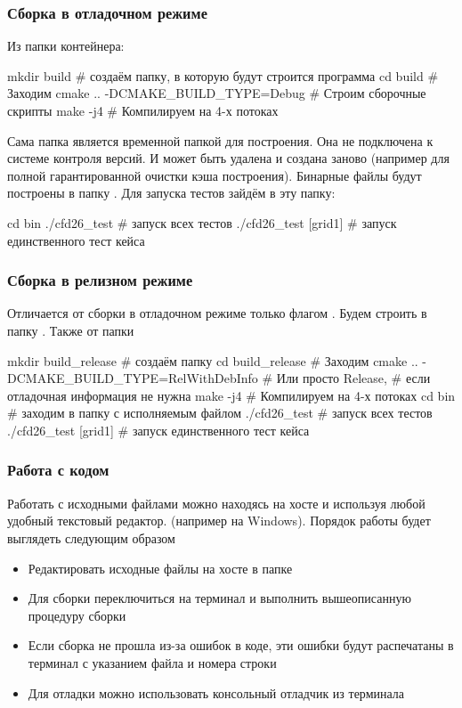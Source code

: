\subsubsection{Сборка в отладочном режиме}
Из папки  контейнера:
\begin{shelloutput}
mkdir build                        # создаём папку, в которую будут строится программа
cd build                           # Заходим
cmake .. -DCMAKE_BUILD_TYPE=Debug  # Строим сборочные скрипты
make -j4                           # Компилируем на 4-х потоках
\end{shelloutput}
Сама папка  является временной папкой для построения.
Она не подключена к системе контроля версий.  И может быть удалена и создана заново (например для полной гарантированной очистки кэша построения).
Бинарные файлы будут построены в папку .
Для запуска тестов зайдём в эту папку:
\begin{shelloutput}
cd bin
./cfd26_test                # запуск всех тестов
./cfd26_test [grid1]        # запуск единственного тест кейса
\end{shelloutput}

\subsubsection{Сборка в релизном режиме}
Отличается от сборки в отладочном режиме только флагом .
Будем строить в папку .
Также от папки 
\begin{shelloutput}
mkdir build_release                         # создаём папку
cd build_release                            # Заходим
cmake .. -DCMAKE_BUILD_TYPE=RelWithDebInfo  # Или просто Release,
                                            # если отладочная информация не нужна
make -j4                                    # Компилируем на 4-х потоках
cd bin                                      # заходим в папку с исполняемым файлом
./cfd26_test                                # запуск всех тестов
./cfd26_test [grid1]                        # запуск единственного тест кейса
\end{shelloutput}

\subsubsection{Работа с кодом}
Работать с исходными файлами можно находясь на хосте и используя любой удобный текстовый редактор.
(например  на Windows).
Порядок работы будет выглядеть следующим образом
\begin{itemize}
\item Редактировать исходные файлы на хосте в папке 
\item Для сборки переключиться на терминал и выполнить вышеописанную процедуру сборки
\item Если сборка не прошла из-за ошибок в коде, эти ошибки будут распечатаны в терминал с указанием файла и номера строки
\item Для отладки можно использовать консольный отладчик  из терминала
\end{itemize}

